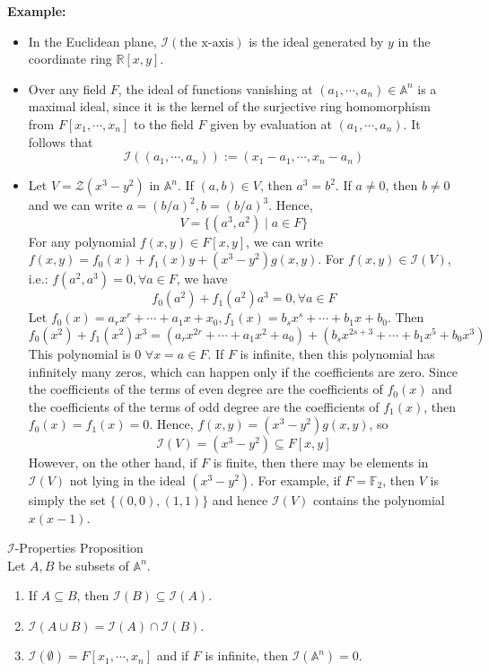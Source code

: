 \noindent\textbf{Example:} \begin{itemize}
    \item In the Euclidean plane, $\mathcal{I}( \text{the x-axis})$ is the ideal generated by $y$ in the coordinate ring $\mathbb{R}[x,y]$.
    \item Over any field $F$, the ideal of functions vanishing at $(a_1 ,\cdots, a_n) \in \mathbb{A}^n$ is a maximal ideal, since it is the kernel of the surjective ring homomorphism from $F[x_1 ,\cdots, x_n]$ to the field $F$ given by evaluation at $(a_1 ,\cdots, a_n)$. It follows that
    $$\mathcal{I} ((a_1 ,\cdots, a_n)) := (x_1-a_1 ,\cdots, x_n-a_n)$$

    \item Let $V= \mathcal{Z} (x^3-y^2)$ in $\mathbb{A}^n$. If $(a,b) \in V$, then $a^3=b^2$. If $a\neq 0$, then $b\neq 0$ and we can write $a= (b/a)^2, b=(b/a)^3$. Hence,
    $$V=\{ (a^3,a^2) \mid a\in F\}$$
    For any polynomial $f(x,y) \in F[x,y]$, we can write $f(x,y) =f_0(x) + f_1(x)y +(x^3- y^2) g(x,y)$. For $f(x,y) \in \mathcal{I}(V)$, i.e.: $f(a^2,a^3)=0,\forall a\in F$, we have
    $$f_0(a^2) + f_1(a^2)a^3=0, \forall a\in F$$
    Let $f_0 (x)=a_rx^r +\cdots +a_1x+x_0, f_1(x)= b_sx^s +\cdots+ b_1x+b_0$. Then
    $$f_0(x^2)+ f_1(x^2)x^3= (a_rx^{2r} +\cdots + a_1x^2+ a_0) + (b_sx^{2s+3}+ \cdots+ b_1x^{5}+b_0x^3)$$
    This polynomial is $0$ $\forall x=a\in F$. If $F$ is infinite, then this polynomial has infinitely many zeros, which can happen only if the coefficients are zero. Since the coefficients of the terms of even degree are the coefficients of $f_0(x)$ and the coefficients of the terms of odd degree are the coefficients of $f_1(x)$, then $f_0(x) =f_1(x) =0$. Hence, $f(x,y)=(x^3-y^2)g(x,y)$, so
    $$\mathcal{I}(V) = (x^3-y^2) \subseteq F[x,y]$$
    However, on the other hand, if $F$ is finite, then there may be elements in $\mathcal{I}(V)$ not lying in the ideal $(x^3-y^2)$. For example, if $F= \mathbb{F}_2$, then $V$ is simply the set $\{{(0,0)},(1,1)\}$ and hence $\mathcal{I}(V)$ contains the polynomial $x(x-1)$.
\end{itemize}


\begin{proposition}{$\mathcal{I}$-Properties Proposition}\\
Let $A,B$ be subsets of $\mathbb{A}^n$.
\begin{enumerate}
    \item If $A \subseteq B$, then $\mathcal{I} (B) \subseteq \mathcal{I}(A)$.
    \item $\mathcal{I}(A \cup B) = \mathcal{I}(A) \cap \mathcal{I} (B)$.
    \item $\mathcal{I} (\emptyset) =F[x_1 ,\cdots, x_n]$ and if $F$ is infinite, then $\mathcal{I} (\mathbb{A}^n) =0$.
\end{enumerate}
\end{proposition}

